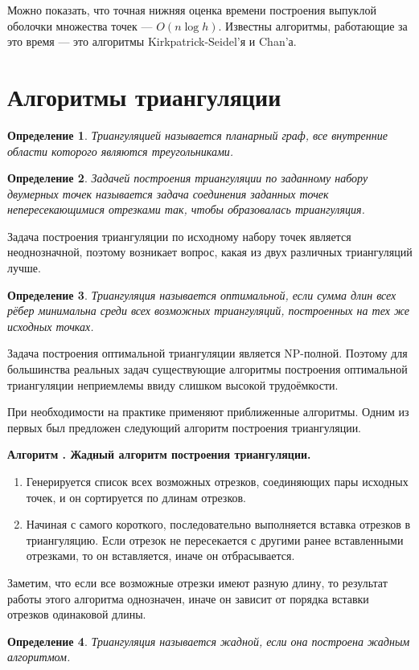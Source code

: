 \documentclass[a4paper]{article}
\newcounter{algorithm}
\newenvironment{algorithm}[1]{\par\smallskip\noindent\refstepcounter{algorithm}%
  \textbf{Алгоритм \arabic{algorithm}. #1}\begin{enumerate}}{\end{enumerate}}
\newtheorem{define}{Определение}
\begin{document}
Можно показать, что точная нижняя оценка времени построения выпуклой
оболочки множества точек --- $O(n\log h)$. Известны алгоритмы,
работающие за это время --- это алгоритмы Kirkpatrick-Seidel'я и Chan'а.

\section{Алгоритмы триангуляции}
\begin{define}
  Триангуляцией называется планарный граф, все внутренние области
  которого являются треугольниками.
\end{define}
\begin{define}
  Задачей построения триангуляции по заданному набору двумерных точек
  называется задача соединения заданных точек непересекающимися
  отрезками так, чтобы образовалась триангуляция.
\end{define}

Задача построения триангуляции по исходному набору точек является
неоднозначной, поэтому возникает вопрос, какая из двух различных
триангуляций лучше.

\begin{define}
  Триангуляция называется оптимальной, если сумма длин всех рёбер
  минимальна среди всех возможных триангуляций, построенных на тех
  же исходных точках.
\end{define}

Задача построения оптимальной триангуляции является NP-полной.
Поэтому для большинства реальных задач
существующие алгоритмы построения оптимальной триангуляции
неприемлемы ввиду слишком высокой трудоёмкости.

При  необходимости  на практике применяют приближенные алгоритмы.
Одним  из  первых был  предложен  следующий  алгоритм  построения
триангуляции.
\begin{algorithm}{Жадный алгоритм построения триангуляции.}
\item Генерируется список всех возможных отрезков, соединяющих пары
  исходных точек, и он сортируется по длинам отрезков.
\item Начиная с самого короткого, последовательно выполняется вставка
  отрезков в триангуляцию. Если отрезок не пересекается с другими
  ранее вставленными отрезками, то он вставляется, иначе он
  отбрасывается.
\end{algorithm}

Заметим, что если все возможные отрезки имеют разную длину, то
результат работы этого алгоритма однозначен, иначе он зависит от
порядка вставки отрезков одинаковой длины.
\begin{define}
  Триангуляция называется жадной, если она построена жадным
  алгоритмом.
\end{define}
\end{document}
